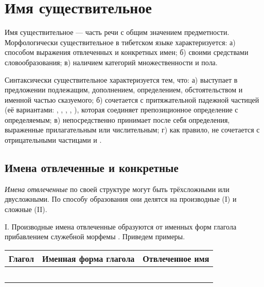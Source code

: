 \section{Имя существительное}

Имя существительное --- часть речи с общим значением предметности. Морфологически существительное в тибетском языке характеризуется: а) способом выражения отвлеченных и конкретных имен; б) своими средствами словообразования; в) наличием категорий множественности и пола.

Синтаксически существительное характеризуется тем, что: а) выступает в предложении подлежащим, дополнением, определением, обстоятельством и именной частью сказуемого; б) сочетается с притяжательной падежной частицей (её вариантами: , , , , ), которая соединяет препозиционное определение с определяемым; в) непосредственно принимает после себя определения, выраженные прилагательным или числительным; г) как правило, не сочетается с отрицательными частицами  и .

\subsection{Имена отвлеченные и конкретные}

\emph{Имена отвлеченные} по своей структуре могут быть трёхсложными или двусложными. По способу образования они делятся на производные (I) и сложные (II).

I. Производные имена отвлеченные образуются от именных форм глагола прибавлением служебной морфемы . Приведем примеры.

\begin{tabularx}{\textwidth}{*{3}{p{}}}
    \toprule
    \parbox[m]{0.3\textwidth}{Глагол} & \parbox[m]{0.3\textwidth}{\centering Именная форма глагола} & \parbox[m]{0.3\textwidth}{\centering Отвлеченное имя}\\
    \midrule
    \endhead
     &  & \\
     &  & \\
     &  & \\
     &  & \\
     &  & \\
    \bottomrule
\end{tabularx}

